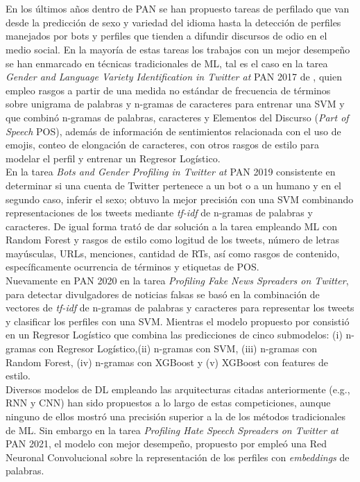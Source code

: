  \\
 \\
 En los últimos años dentro de PAN se han propuesto tareas de perfilado que van desde la predicción de sexo y variedad del idioma  hasta la detección de perfiles manejados por bots y perfiles que tienden a difundir discursos de odio en el medio social. En la mayoría de estas tareas los trabajos con un mejor desempeño se han enmarcado en técnicas tradicionales de ML, tal es el caso en la tarea \textit{Gender and Language Variety Identification in Twitter at} PAN 2017 de \citep{basile:2017}, quien empleo rasgos a partir de una medida no estándar de frecuencia de términos sobre unigrama de palabras y n-gramas de caracteres para entrenar una SVM y \citep{martinc:2017}  que combinó n-gramas de palabras, caracteres y Elementos del Discurso (\textit{Part of Speech} POS), además de información de sentimientos relacionada con el uso de emojis, conteo de elongación de caracteres, con otros rasgos de estilo para modelar el perfil y entrenar un Regresor Logístico. 
 \\
 En la tarea \textit{Bots and Gender Profiling in Twitter at} PAN 2019 consistente en determinar si una cuenta de Twitter pertenece a un bot o a un humano y en el segundo caso, inferir el sexo; \citep{DBLP:conf/clef/Pizarro19} obtuvo la mejor precisión con una SVM combinando representaciones de los tweets mediante \textit{tf-idf} de n-gramas de palabras y caracteres. De igual forma \citep{DBLP:conf/clef/Johansson19} trató de dar solución a la tarea empleando ML con Random Forest y rasgos de estilo como logitud de los tweets, número de letras mayúsculas, URLs, menciones, cantidad de RTs, así como rasgos de contenido, específicamente ocurrencia de términos y etiquetas de POS.
 \\ 
 Nuevamente en PAN 2020 en la tarea \textit{Profiling Fake News Spreaders on Twitter}, para detectar divulgadores de noticias falsas \citep{pizarro:2020} se basó en la combinación de vectores de \textit{tf-idf} de n-gramas de palabras y caracteres para representar los tweets y clasificar los perfiles con una SVM. Mientras el modelo propuesto por \citep{buda:2020} consistió en un Regresor Logístico que combina las predicciones de cinco submodelos: (i) n-gramas con Regresor Logístico,(ii) n-gramas con SVM, (iii) n-gramas con Random Forest, (iv) n-gramas con XGBoost y (v) XGBoost con features de estilo.
 \\
Diversos modelos de DL empleando las arquitecturas citadas anteriormente (e.g., RNN y CNN) han sido propuestos a lo largo de estas competiciones, aunque ninguno de ellos mostró una precisión superior a la de los métodos tradicionales de ML. Sin embargo en la tarea \textit{Profiling Hate Speech Spreaders on Twitter at} PAN 2021, el modelo con mejor desempeño, propuesto por \citep{sinno:2021} empleó una Red Neuronal Convolucional sobre la representación de los perfiles con \textit{embeddings} de palabras. 
